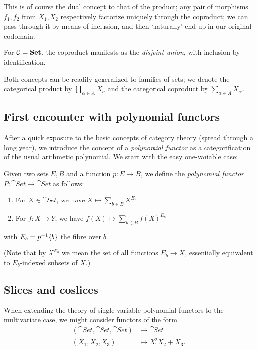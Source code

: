 This is of course the dual concept to that of the product; any pair of morphisms $f_1,f_2$ from $X_1,X_2$ respectively factorize uniquely through the coproduct; we can pass through it by means of inclusion, and then `naturally' end up in our original codomain.

For $\mathcal{C}=\mathbf{Set}$, the coproduct manifests as the \emph{disjoint union}, with inclusion by identification.

Both concepts can be readily generalized to families of sets; we denote the categorical product by $\prod_{\alpha\in A} X_\alpha$ and the categorical coproduct by $\sum_{\alpha\in A} X_\alpha$.



\subsection{First encounter with polynomial functors}

After a quick exposure to the basic concepts of category theory (spread through a long year), we introduce the concept of a \emph{polynomial functor} as a categorification of the usual arithmetic polynomial. We start with the easy one-variable case:

\begin{definition}
	Given two sets $E,B$ and a function $p:E\to B$, we define the \emph{polynomial functor} $P:\cat{Set}\to\cat{Set}$ as follows:
    \begin{enumerate}
    \item For $X\in\cat{Set}$, we have $X \mapsto \sum_{b\in B} X^{E_b}$
    \item For $f:X\to Y$, we have $f(X) \mapsto \sum_{b\in B} f(X)^{E_b}$
    \end{enumerate}

    with $E_b=p^{-1}\{b\}$ the fibre over $b$.
\end{definition}

(Note that by $X^{E_b}$ we mean the set of all functions $E_b\to X$, essentially equivalent to $E_b$-indexed subsets of $X$.)



\subsection{Slices and coslices}

When extending the theory of single-variable polynomial functors to the multivariate case, we might consider functors of the form
\begin{align*}
	(\cat{Set},\cat{Set},\cat{Set}) &\to \cat{Set}\\
    (X_1,X_2,X_3) &\mapsto X_1^2X_2 + X_3.
\end{align*}

